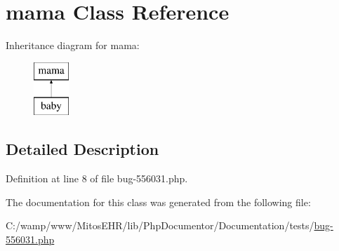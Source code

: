 \hypertarget{classmama}{\section{mama \-Class \-Reference}
\label{classmama}
}
\-Inheritance diagram for mama\-:\begin{figure}[H]
\begin{center}
\leavevmode
\includegraphics[height=2.000000cm]{classmama}
\end{center}
\end{figure}


\subsection{\-Detailed \-Description}


\-Definition at line 8 of file bug-\/556031.\-php.



\-The documentation for this class was generated from the following file\-:\begin{DoxyCompactItemize}
\item 
\-C\-:/wamp/www/\-Mitos\-E\-H\-R/lib/\-Php\-Documentor/\-Documentation/tests/\hyperlink{bug-556031_8php}{bug-\/556031.\-php}\end{DoxyCompactItemize}
